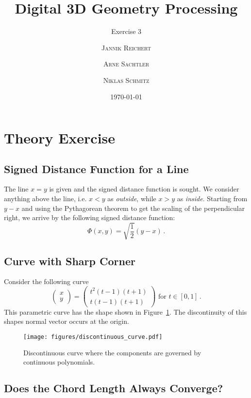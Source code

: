 \documentclass{scrartcl}
\title{Digital 3D Geometry Processing}
\subtitle{Exercise 3}
\author{\textsc{Jannik Reichert} \and \textsc{Arne Sachtler} \and \textsc{Niklas Schmitz}}
\date{\today}
\begin{document}
\maketitle

\section{Theory Exercise}

\subsection{Signed Distance Function for a Line}
The line $x = y$ is given and the signed distance function is sought.
We consider anything above the line, i.e. $x < y$ as \emph{outside},
while $x > y$ as \emph{inside}. Starting from $y - x$ and using the Pythagorean theorem
to get the scaling of the perpendicular right, we arrive by the following signed distance function:
\begin{equation}
	\Phi (x,y) = \sqrt{\frac{1}{2}} (y - x) \, .
\end{equation}

\subsection{Curve with Sharp Corner}

Consider the following curve
\begin{equation}
	\begin{pmatrix}x\\y\end{pmatrix} = \begin{pmatrix}t^2 (t-1) (t+1)\\t (t-1) (t+1)\end{pmatrix} \text{ for } t \in [0, 1]\, .
\end{equation}
This parametric curve has the shape shown in Figure~\ref{fig:disc}. The discontinuity of this shapes normal vector occurs at the origin.
\begin{figure}[h]
	\centering
	\texttt{[image: figures/discontinuous\_curve.pdf]}
	\caption{Discontinuous curve where the components are governed by continuous polynomials.}
	\label{fig:disc}
\end{figure}


\newpage

\subsection{Does the Chord Length Always Converge?}
\end{document}

